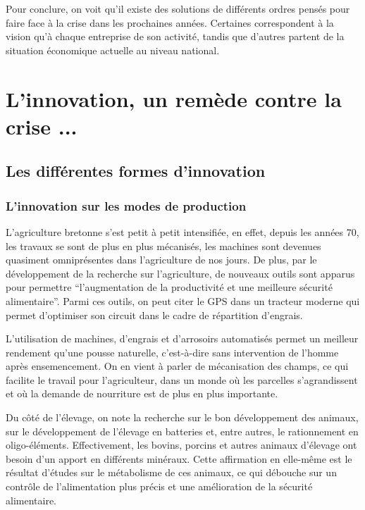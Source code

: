 \documentclass[a4paper,10pt]{report}
\begin{document}
			Pour conclure, on voit qu’il existe des solutions de différents ordres pensés pour faire face à la crise dans les prochaines années. Certaines correspondent à la vision qu’à chaque entreprise de son activité, tandis que d’autres partent de la situation économique actuelle au niveau national.
			
\chapter{L'innovation, un remède contre la crise ...}
	
	\section{Les différentes formes d'innovation}
	
		\subsection{L'innovation sur les modes de production}
			L’agriculture bretonne s’est petit à petit intensifiée, en effet, depuis les années 70, les travaux se sont de plus en plus mécanisés, les machines sont devenues quasiment omniprésentes dans l’agriculture de nos jours. De plus, par le développement de la recherche sur l’agriculture, de nouveaux outils sont apparus pour permettre “l’augmentation de la productivité et une meilleure sécurité alimentaire”\cite{FAOStatisticalYearbook2013}. Parmi ces outils, on peut citer le GPS dans un tracteur moderne\cite{RobotsChamps} qui permet d’optimiser son circuit dans le cadre de répartition d’engrais.
			
			
			L’utilisation de machines, d’engrais et d’arrosoirs automatisés permet un meilleur rendement qu’une pousse naturelle, c’est-à-dire sans intervention de l’homme après ensemencement. On en vient à parler de mécanisation des champs, ce qui facilite le travail pour l’agriculteur, dans un monde où les parcelles s’agrandissent et où la demande de nourriture est de plus en plus importante.
			
			Du côté de l’élevage, on note la recherche sur le bon développement des animaux, sur le développement de l’élevage en batteries et, entre autres, le rationnement en oligo-éléments\cite{OligoElements}. Effectivement, les bovins, porcins et autres animaux d’élevage ont besoin d’un apport en différents minéraux. Cette affirmation en elle-même est le résultat d’études sur le métabolisme de ces animaux, ce qui débouche sur un contrôle de l’alimentation plus précis et une amélioration de la sécurité alimentaire.
			
\end{document}
